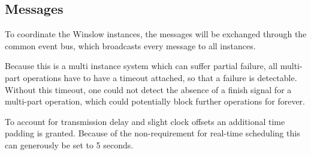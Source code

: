 \subsection{Messages}
\label{message:grace_period}

To coordinate the Winslow instances, the messages will be exchanged through the common event bus, which broadcasts every message to all instances.

Because this is a multi instance system which can suffer partial failure, all multi-part operations have to have a timeout attached, so that a failure is detectable.
Without this timeout, one could not detect the absence of a finish signal for a multi-part operation, which could potentially block further operations for forever.

To account for transmission delay and slight clock offsets an additional time padding is granted.
Because of the non-requirement for real-time scheduling this can generously be set to 5 seconds.

